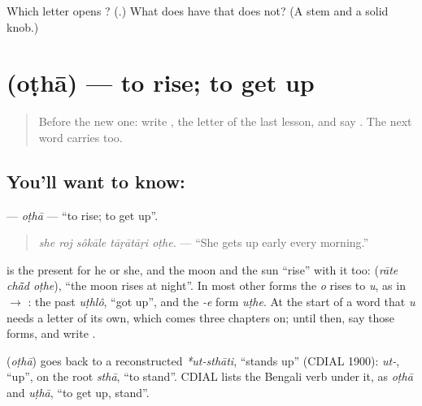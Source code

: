 \begin{tcolorbox}[breakable,colback=teal!4,colframe=teal!35!black,title={Before you move on}]
Which letter opens \textbf{}? (\textbf{}.) What does \textbf{} have that \textbf{} does not? (A stem and a solid knob.)
\end{tcolorbox}
\section[\texorpdfstring{\bn{ওঠা} (oṭhā)}{ওঠা (oṭhā)}]{ (oṭhā) — to rise; to get up}

\label{lesson:BN-C266-otha}



\begin{quote}
Before the new one: write \textbf{}, the letter of the last lesson, and say \textbf{}. The next word carries \textbf{} too.
\end{quote}

\subsection*{You'll want to know: }
\textbf{} — \emph{oṭhā} — \textquotedblleft{}to rise; to get up\textquotedblright{}.

\begin{quote}
\textbf{    }
\end{quote}

\begin{quote}
\emph{she roj sôkāle tāṛātāṛi oṭhe.} — \textquotedblleft{}She gets up early every morning.\textquotedblright{}
\end{quote}

\textbf{} is the present for he or she, and the moon and the sun \textquotedblleft{}rise\textquotedblright{} with it too: \textbf{  } (\emph{rāte chā̃d oṭhe}), \textquotedblleft{}the moon rises at night\textquotedblright{}. In most other forms the \emph{o} rises to \emph{u}, as in \textbf{} $\to$ \textbf{}: the past \emph{uṭhlô}, \textquotedblleft{}got up\textquotedblright{}, and the \emph{-e} form \emph{uṭhe}. At the start of a word that \emph{u} needs a letter of its own, which comes three chapters on; until then, say those forms, and write \textbf{}.

\begin{cousinweb}
\textbf{} (\emph{oṭhā}) goes back to a reconstructed \emph{*ut-sthāti}, \textquotedblleft{}stands up\textquotedblright{} (CDIAL 1900): \emph{ut-}, \textquotedblleft{}up\textquotedblright{}, on the root \emph{sthā}, \textquotedblleft{}to stand\textquotedblright{}. CDIAL lists the Bengali verb under it, as \emph{oṭhā} and \emph{uṭhā}, \textquotedblleft{}to get up, stand\textquotedblright{}.
\end{cousinweb}

